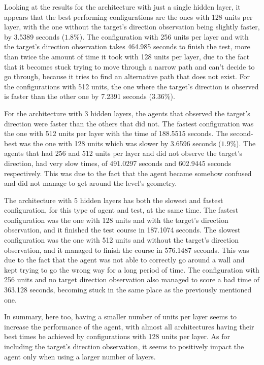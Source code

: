 Looking at the results for the architecture with just a single hidden layer, it appears that the best performing configurations are the ones with 128 units per layer, with the one without the target's direction observation being slightly faster, by 3.5389 seconds ($1.8\%$). The configuration with 256 units per layer and with the target's direction observation takes 464.985 seconds to finish the test, more than twice the amount of time it took with 128 units per layer, due to the fact that it becomes stuck trying to move through a narrow path and can't decide to go through, because it tries to find an alternative path that does not exist. For the configurations with 512 units, the one where the target's direction is observed is faster than the other one by 7.2391 seconds ($3.36\%$).

For the architecture with 3 hidden layers, the agents that observed the target's direction were faster than the others that did not. The fastest configuration was the one with 512 units per layer with the time of 188.5515 seconds. The second-best was the one with 128 units which was slower by 3.6596 seconds ($1.9\%$). The agents that had 256 and 512 units per layer and did not observe the target's direction, had very slow times, of 491.0297 seconds and 602.9445 seconds respectively. This was due to the fact that the agent became somehow confused and did not manage to get around the level's geometry.

The architecture with 5 hidden layers has both the slowest and fastest configuration, for this type of agent and test, at the same time. The fastest configuration was the one with 128 units and with the target's direction observation, and it finished the test course in 187.1074 seconds. The slowest configuration was the one with 512 units and without the target's direction observation, and it managed to finish the course in 576.1487 seconds. This was due to the fact that the agent was not able to correctly go around a wall and kept trying to go the wrong way for a long period of time. The configuration with 256 units and no target direction observation also managed to score a bad time of 363.128 seconds, becoming stuck in the same place as the previously mentioned one.

In summary, here too, having a smaller number of units per layer seems to increase the performance of the agent, with almost all architectures having their best times be achieved by configurations with 128 units per layer. As for including the target's direction observation, it seems to positively impact the agent only when using a larger number of layers.

